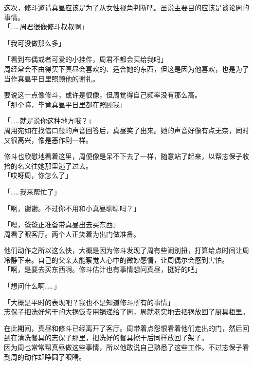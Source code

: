 这次，修斗邀请真昼应该是为了从女性视角判断吧。虽说主要目的应该是谈论周的事情。\\

「……周君很像修斗叔叔啊」

「我可没做那么多」

「看到布偶或者可爱的小挂件，周君不都会买给我吗」\\

周经常会不由得买下真昼会喜欢的、适合她的东西，但这是因为他喜欢，也是为了当作真昼平日里照顾他的谢礼。

要说这一点像修斗，或许是很像，但周觉得自己频率没有那么高。\\

「那个嘛，毕竟真昼平日里都在照顾我」

「……就是说你这种地方哦？」\\

周用宛如在找借口般的声音回答后，真昼笑了出来。她的声音好像有点无奈，同时又很高兴，像是恶作剧一样。

修斗也欣慰地看着这里，周便像是呆不下去了一样，随意站了起来，以帮志保子收拾的名义往她那里逃了过去。\\

「哎呀周，你怎么了」

「……我来帮忙了」

「啊，谢谢。不过你不用和小真昼聊聊吗？」

「嗯，爸爸正准备带真昼出去买东西」\\

周看了眼客厅。两个人正笑着为出门做准备。

他们动作之所以这么快，大概是因为修斗发现了周有些闹别扭，打算给点时间让周冷静下来。自己的父亲太能察觉人心中的微妙感情，让周偶尔会感到害怕。\\

「啊，是要去买东西啊。修斗估计也有事情想问真昼，挺好的吧」

「想问什么啊……」

「大概是平时的表现吧？我也不是知道修斗所有的事情」\\

志保子把洗好烤干的大锅饭专用锅递给了周，周就老实地去把锅放回了厨具柜里。

在此期间，真昼和修斗已经离开了客厅。周带着点怨恨看着他们走出的门，然后回到在清洗餐具的志保子那里，把洗好的餐具擦干后同样放回了架子。\\

因为周也常常帮真昼做这些事情，所以他敢说自己熟悉了这些工作。不过志保子看到周的动作却睁圆了眼睛。\\

